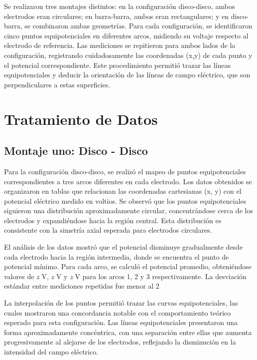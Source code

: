 \documentclass[11pt,twocolumn]{article}
\begin{document}
Se realizaron tres montajes distintos: en la configuración disco-disco, ambos electrodos eran circulares; en barra-barra, ambos eran rectangulares; y en disco-barra, se combinaron ambas geometrías. Para cada configuración, se identificaron cinco puntos equipotenciales en diferentes arcos, midiendo su voltaje respecto al electrodo de referencia. Las mediciones se repitieron para ambos lados de la configuración, registrando cuidadosamente las coordenadas (x,y) de cada punto y el potencial correspondiente. Este procedimiento permitió trazar las líneas equipotenciales y deducir la orientación de las líneas de campo eléctrico, que son perpendiculares a estas superficies.

\section{Tratamiento de Datos}
\subsection{Montaje uno: Disco - Disco}
Para la configuración disco-disco, se realizó el mapeo de puntos equipotenciales correspondientes a tres arcos diferentes en cada electrodo. Los datos obtenidos se organizaron en tablas que relacionan las coordenadas cartesianas (x, y) con el potencial eléctrico medido en voltios. Se observó que los puntos equipotenciales siguieron una distribución aproximadamente circular, concentrándose cerca de los electrodos y expandiéndose hacia la región central. Esta distribución es consistente con la simetría axial esperada para electrodos circulares.

El análisis de los datos mostró que el potencial disminuye gradualmente desde cada electrodo hacia la región intermedia, donde se encuentra el punto de potencial mínimo. Para cada arco, se calculó el potencial promedio, obteniéndose valores de \textit{z} V, \textit{z} V y \textit{z} V para los arcos 1, 2 y 3 respectivamente. La desviación estándar entre mediciones repetidas fue menor al 2%

La interpolación de los puntos permitió trazar las curvas equipotenciales, las cuales mostraron una concordancia notable con el comportamiento teórico esperado para esta configuración. Las líneas equipotenciales presentaron una forma aproximadamente concéntrica, con una separación entre ellas que aumenta progresivamente al alejarse de los electrodos, reflejando la disminución en la intensidad del campo eléctrico.
\end{document}
